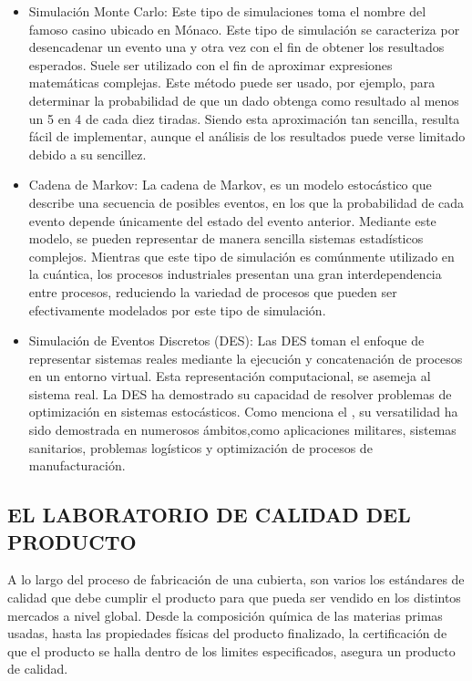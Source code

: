 \begin{itemize}
	\item Simulación Monte Carlo: Este tipo de simulaciones toma el nombre
		del famoso casino ubicado en Mónaco.
		Este tipo de simulación se caracteriza por desencadenar un evento
		una y otra vez con el fin de obtener los resultados esperados.
		Suele ser utilizado con el fin de aproximar
		expresiones matemáticas complejas.
		Este método puede ser usado, por ejemplo,
		para determinar la probabilidad de que
		un dado obtenga como resultado
		al menos un 5 en 4 de cada diez tiradas.
		Siendo esta aproximación tan sencilla,
		resulta fácil de implementar,
		aunque el análisis de los resultados puede verse limitado
		debido a su sencillez.
	\item Cadena de Markov: La cadena de Markov,
		es un modelo estocástico que describe
		una secuencia de posibles eventos,
		en los que la probabilidad de cada evento
		depende únicamente del estado del evento anterior.
		Mediante este modelo, se pueden representar
		de manera sencilla sistemas estadísticos complejos.
		Mientras que este tipo de simulación
		es comúnmente utilizado en la cuántica,
		los procesos industriales presentan
		una gran interdependencia entre procesos,
		reduciendo la variedad de procesos que pueden
		ser efectivamente modelados por este tipo de simulación.
	\item Simulación de Eventos Discretos (DES):
		Las DES toman el enfoque de representar sistemas reales
		mediante la ejecución y concatenación
		de procesos en un entorno virtual.
		Esta representación computacional, se asemeja al sistema real.
		La DES ha demostrado su capacidad de resolver
		problemas de optimización en sistemas estocásticos.
		Como menciona el \citep{allen2011introduction},
		su versatilidad ha sido demostrada en numerosos ámbitos,como
		aplicaciones militares,
		sistemas sanitarios,
		problemas logísticos
		y optimización de procesos de manufacturación.
\end{itemize}

\subsection{EL LABORATORIO DE CALIDAD DEL \newline PRODUCTO}

A lo largo del proceso de fabricación de una cubierta,
son varios los estándares de calidad que debe cumplir el producto
para que pueda ser vendido en los distintos mercados a nivel global.
Desde la composición química de las materias primas usadas,
hasta las propiedades físicas del producto finalizado,
la certificación de que el producto se halla dentro de los limites especificados,
asegura un producto de calidad.

